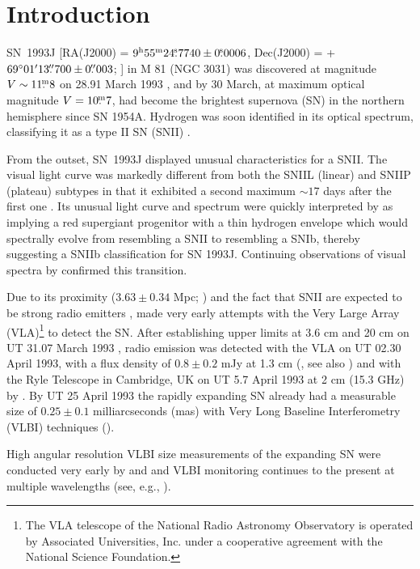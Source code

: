 \documentclass[12pt,preprint]{aastex}
\begin{document}
\section{Introduction}

SN~1993J [RA(J2000) = $9^{\rm h}55^{\rm m}24{\mbox{$.\!\!^{\mathrm s}$}}7740 \pm 0{\mbox{$.\!\!^{\mathrm s}$}} 0006$, 
Dec(J2000) =   +$69^{\circ}01\mbox{$^\prime$} 13{\mbox{$.\!\!^{\prime\prime}$}}700 \pm 0\mbox{$.\!\!^{\prime\prime}$} 003$;
\citealt{Marcaide93a}] in M 81 (NGC 3031) was discovered at magnitude
$V\sim11{\mbox{$.\!\!^{\mathrm m}$}}8$ on 28.91 March 1993 \citep{Ripero93}, and by 30 March,
at maximum optical magnitude $V = 10{\mbox{$.\!\!^{\mathrm m}$}}7$, had become the brightest supernova
(SN) in the northern hemisphere since SN 1954A.  Hydrogen was soon
identified in its optical spectrum, classifying it as a type II SN
(SNII) \citep[see, e.g., ][]{Gomez93,Andrillat93,Filippenko93a}.

From the outset, SN~1993J displayed unusual characteristics for a
SNII.    The visual light curve was markedly different from both the
SNIIL (linear) and SNIIP (plateau) subtypes in that it exhibited a
second maximum $\sim17$ days after the first one \citep{VanDriel93}.  Its
unusual light curve and spectrum were quickly interpreted by
\citet{Podsiadlowski93,Nomoto93,Swartz93} as implying a red supergiant
progenitor with a thin hydrogen envelope which would spectrally evolve
from resembling a SNII to resembling a SNIb, thereby suggesting a SNIIb
classification for SN 1993J.  Continuing observations of visual spectra
by \citet{Filippenko93b} confirmed this transition.

Due to its proximity ($3.63 \pm 0.34$ Mpc; \citealt{Freedman94}) and the
fact that  SNII are expected to be strong radio emitters
\citep{Weiler89}, \citet{Sramek93} made  very early attempts with the
Very Large Array (VLA)\footnote{The VLA telescope of the National Radio
Astronomy Observatory is operated by Associated Universities, Inc. under
a cooperative agreement with the National Science Foundation.} to detect
the SN.  After establishing upper limits at 3.6 cm and 20 cm on  UT
31.07 March 1993 \citep{Sramek93}, radio emission was detected with the
VLA on UT 02.30 April 1993, with a flux density of $0.8 \pm 0.2$ mJy at
1.3 cm (\citealt{Weiler93}, see also \citealt{VanDyk93a,VanDyk93b}) and
with the Ryle Telescope in Cambridge, UK on UT 5.7 April 1993 at 2 cm
(15.3 GHz) by \citet{Pooley93a}.  By UT 25 April 1993 the rapidly expanding
SN already had a measurable size of $0.25 \pm 0.1$ milliarcseconds (mas)
with Very Long Baseline Interferometry (VLBI) techniques (\citealt{Marcaide93a,Marcaide93b}).

High angular resolution VLBI size measurements of the expanding
SN were conducted very early by \citet{Marcaide94} and \citet{Bartel94}
and VLBI monitoring continues to the present at multiple wavelengths (see, e.g.,
\citealp{Marcaide95a,Marcaide95b,Marcaide97,Marcaide05,Marcaide07,Bartel00,Bartel02,Bietenholz01,Bietenholz03}).
\end{document}
